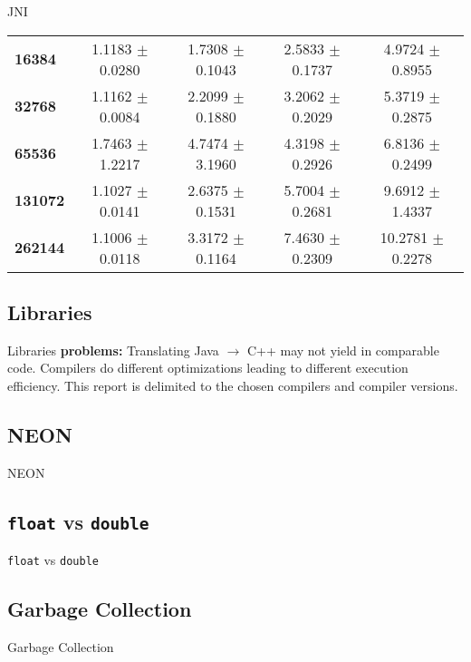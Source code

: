 \documentclass[xcolor={table}]{beamer}
\begin{document}
\begin{frame}{JNI}
{\begin{tabular}{lcccc}
            \textbf{16384}  & 1.1183 $\pm$ 0.0280 & 1.7308 $\pm$ 0.1043 & 2.5833 $\pm$ 0.1737 & 4.9724 $\pm$ 0.8955\\
            \textbf{32768}  & 1.1162 $\pm$ 0.0084 & 2.2099 $\pm$ 0.1880 & 3.2062 $\pm$ 0.2029 & 5.3719 $\pm$ 0.2875\\
            \textbf{65536}  & 1.7463 $\pm$ 1.2217 & 4.7474 $\pm$ 3.1960 & 4.3198 $\pm$ 0.2926 & 6.8136 $\pm$ 0.2499\\
            \textbf{131072}  & 1.1027 $\pm$ 0.0141 & 2.6375 $\pm$ 0.1531 & 5.7004 $\pm$ 0.2681 & 9.6912 $\pm$ 1.4337\\
            \textbf{262144} & 1.1006 $\pm$ 0.0118 & 3.3172 $\pm$ 0.1164 & 7.4630 $\pm$ 0.2309 & 10.2781 $\pm$ 0.2278\\
            \bottomrule
        \end{tabular}
    }
\end{frame}

\subsection{Libraries}
\begin{frame}{Libraries}
    \textbf{problems:} Translating Java $\rightarrow$ C++ may not yield in comparable code. Compilers do different optimizations leading to different execution efficiency. This report is delimited to the chosen compilers and compiler versions.
\end{frame}

\subsection{NEON}
\begin{frame}{NEON}
\end{frame}

\subsection{\texttt{float} vs \texttt{double}}
\begin{frame}{\texttt{float} vs \texttt{double}}
\end{frame}

\subsection{Garbage Collection}
\begin{frame}{Garbage Collection}
\end{frame}
\end{document}
